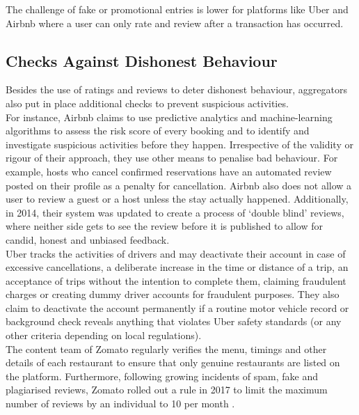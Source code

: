 \documentclass[a4paper, 12pt]{article}
\begin{document}
The challenge of fake or promotional entries is lower for platforms like Uber and Airbnb where a user can only rate and review after a transaction has occurred.\\ 

                                   
                    \subsection{Checks Against Dishonest Behaviour}
                    
                   Besides the use of ratings and reviews to deter dishonest behaviour, aggregators also put in place additional checks to prevent suspicious activities. \\

For instance, Airbnb claims to use predictive analytics and machine-learning algorithms to assess the risk score of every booking and to identify and investigate suspicious activities before they happen. Irrespective of the validity or rigour of their approach, they use other means to penalise bad behaviour. For example, hosts who cancel confirmed reservations have an automated review posted on their profile as a penalty for cancellation. Airbnb also does not allow a user to review a guest or a host unless the stay actually happened. Additionally, in 2014, their system was updated to create a process of ‘double blind’ reviews, where neither side gets to see the review before it is published to allow for candid, honest and unbiased feedback.  \\
                    
                  Uber tracks the activities of drivers and may deactivate their account in case of excessive cancellations, a deliberate increase in the time or distance of a trip, an acceptance of trips without the intention to complete them, claiming fraudulent charges or creating dummy driver accounts for fraudulent purposes. They also claim to deactivate the account permanently if a routine motor vehicle record or background check reveals anything that violates Uber safety standards (or any other criteria depending on local regulations). \\

The content team of Zomato regularly verifies the menu, timings and other details of each restaurant to ensure that only genuine restaurants are listed on the platform. Furthermore, following growing incidents of spam, fake and plagiarised reviews, Zomato rolled out a rule in 2017 to limit the maximum number of reviews by an individual to 10 per month \parencite{Narang17}. \\
\end{document}
